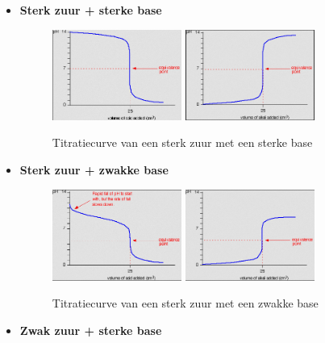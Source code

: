 \documentclass[10pt]{report}
\begin{document}
\begin{itemize}
    \item \textbf{Sterk zuur + sterke base}
        \begin{figure}[h]
            \centering
            \includegraphics[width=0.4\textwidth]{SterkZuurSterkeBaseCurve.png}
            \includegraphics[width=0.4\textwidth]{SterkZuurSterkeBaseCurve2.png}
            \caption{Titratiecurve van een sterk zuur met een sterke base}
        \end{figure}
    \item \textbf{Sterk zuur + zwakke base}
        \begin{figure}[h]
            \centering
            \includegraphics[width=0.4\textwidth]{SterkZuurZwakkeBaseCurve.png}
            \includegraphics[width=0.4\textwidth]{SterkZuurZwakkeBaseCurve2.png}
            \caption{Titratiecurve van een sterk zuur met een zwakke base}
        \end{figure}
    \item \textbf{Zwak zuur + sterke base}

\end{itemize}
\end{document}
